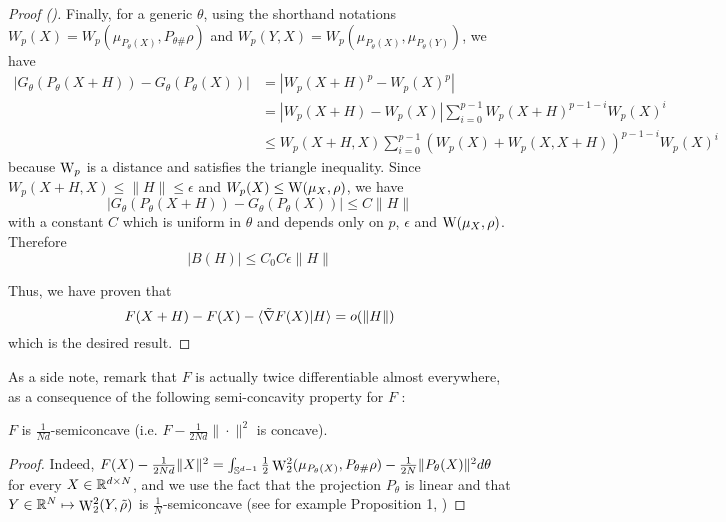 \begin{proof} [Proof ()]
    Finally, for a generic $\theta$, using the shorthand notations $W_p(X) = W_p(\mu_{P_\theta(X)},P_{\theta\#}\rho)$ and $W_p(Y,X) = W_p(\mu_{P_\theta(X)},\mu_{P_\theta(Y)})$, we have
    \begin{align}
        |G_\theta(P_\theta(X+H)) - G_\theta(P_\theta(X))|
            &= |W_p(X+H)^p - W_p(X)^p| \\
            &= |W_p(X+H) - W_p(X)| \sum_{i=0}^{p-1} W_p(X+H)^{p-1-i} W_p(X)^i \\
            &\leq  W_p(X+H,X) \sum_{i=0}^{p-1} (W_p(X)+W_p(X,X+H))^{p-1-i} W_p(X)^i
    \end{align}
    because $\mathrm{W}_p$ is a distance and satisfies the triangle inequality. Since $W_p(X+H,X) \leq \|H\| \leq \epsilon$ and $W_p(X) \leq \mathrm{W}(\mu_X,\rho)$, we have
    \begin{equation}
        |G_\theta(P_\theta(X+H)) - G_\theta(P_\theta(X))| \leq C\|H\|
    \end{equation}
    with a constant $C$ which is uniform in $\theta$ and depends only on $p$, $\epsilon$ and $\mathrm{W}(\mu_X,\rho)$.
    Therefore 
    \begin{equation}
        |B(H)| \leq C_0C\epsilon\|H\|
    \end{equation}
    
    Thus, we have proven that 
    \begin{equation}
        F(X+H) - F(X) - \langle\tilde{\nabla}F(X)|H\rangle = o(\|H\|)
    \end{equation}
    which is the desired result.
\end{proof}

As a side note, remark that $F$ is actually twice differentiable almost everywhere, as a consequence of the following semi-concavity property for $F$ :

\begin{proposition}
    $F$ is $\frac{1}{Nd}$-semiconcave (i.e. $F - \frac{1}{2Nd}\|\cdot\|^2$ is concave).
\end{proposition}

\begin{proof}
    Indeed, $ F(X) - \frac{1}{2Nd}\|X\|^2 = \int_{\mathbb S^{d-1}} \frac{1}{2} \mathop{\mathrm{W}}\nolimits^2_2(\mu_{P_\theta(X)},P_{\theta\#}\rho) - \frac{1}{2N} \|P_\theta(X)\|^2 d\theta $ for every $X \in \mathbb R^{d \times N}$, and we use the fact that the projection $P_\theta$ is linear and that $Y \in \mathbb R^N \mapsto \mathop{\mathrm{W}}\nolimits_2^2(Y,\tilde{\rho})$ is $\frac{1}{N}$-semiconcave (see for example Proposition 1, \citep{Mrigot2021NonasymptoticCB})
\end{proof}

